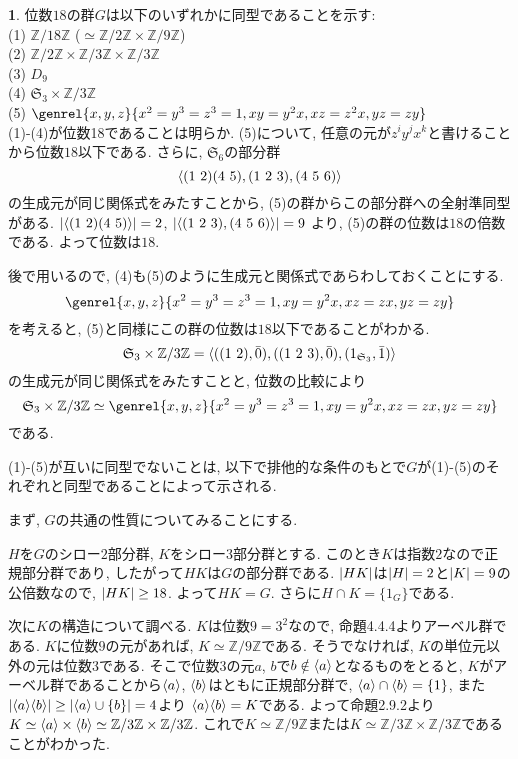 \documentclass{article}
\theoremstyle{definition}
\newtheorem{ans}{}
\numberwithin{ans}{subsection}
\newcommand{\Z}[1]{\mathbb{Z}/#1\mathbb{Z}}
\DeclarePairedDelimiter{\gen}{\langle}{\rangle}
\DeclarePairedDelimiter{\order}{\lvert}{\rvert}
\begin{document}
\begin{ans}
  位数$18$の群$G$は以下のいずれかに同型であることを示す:\\
  (1) $\Z{18}$ ($\simeq \Z{2} \times \Z{9}$)\\
  (2) $\Z{2} \times \Z{3} \times \Z{3}$\\
  (3) $D_9$\\
  (4) $\mathfrak{S}_3 \times \Z{3}$\\
  (5) $\genrel{x, y, z}{x^2 = y^3 = z^3 = 1, xy = y^2x, xz = z^2x, yz = zy}$\\

  (1)-(4)が位数18であることは明らか.
  (5)について, 任意の元が$z^iy^jx^k$と書けることから位数$18$以下である.
  さらに, $\mathfrak{S}_6$の部分群
  \[
    \gen{(1\ 2)(4\ 5), (1\ 2\ 3), (4\ 5\ 6)}
  \]
  の生成元が同じ関係式をみたすことから, (5)の群からこの部分群への全射準同型がある.
  $\order{\gen{(1\ 2)(4\ 5)}} = 2$, $\order{\gen{(1\ 2\ 3), (4\ 5\ 6)}} = 9$
  より, (5)の群の位数は$18$の倍数である. よって位数は$18$.

  後で用いるので, (4)も(5)のように生成元と関係式であらわしておくことにする.
  \[
    \genrel{x, y, z}{x^2 = y^3 = z^3 = 1, xy = y^2x, xz = zx, yz = zy}
  \]
  を考えると, (5)と同様にこの群の位数は$18$以下であることがわかる.
  \[
    \mathfrak{S}_3 \times \Z{3} = \gen{((1\ 2), \bar{0}), ((1\ 2\ 3), \bar{0}), (1_{\mathfrak{S}_3}, \bar{1})}
  \]
  の生成元が同じ関係式をみたすことと, 位数の比較により
  \[
    \mathfrak{S}_3 \times \Z{3} \simeq \genrel{x, y, z}{x^2 = y^3 = z^3 = 1, xy = y^2x, xz = zx, yz = zy}
  \]
  である.

  (1)-(5)が互いに同型でないことは, 以下で排他的な条件のもとで$G$が(1)-(5)のそれぞれと同型であることによって示される.

  まず, $G$の共通の性質についてみることにする.

  $H$を$G$のシロー$2$部分群, $K$をシロー$3$部分群とする.
  このとき$K$は指数$2$なので正規部分群であり, したがって$HK$は$G$の部分群である.
  $\order{HK}$は$\order{H} = 2$と$\order{K} = 9$の公倍数なので, $\order{HK} \ge 18$.
  よって$HK = G$. さらに$H \cap K = \{1_G\}$である.

  次に$K$の構造について調べる.
  $K$は位数$9 = 3^2$なので, 命題4.4.4よりアーベル群である.
  $K$に位数$9$の元があれば, $K \simeq \Z{9}$である.
  そうでなければ, $K$の単位元以外の元は位数$3$である.
  そこで位数$3$の元$a$, $b$で$b \notin \gen{a}$となるものをとると,
  $K$がアーベル群であることから$\gen{a}$, $\gen{b}$はともに正規部分群で,
  $\gen{a} \cap \gen{b} = \{ 1 \}$,
  また$\order{\gen{a}\gen{b}} \ge \order{\gen{a} \cup \{b\}} = 4$より
  $\gen{a}\gen{b} = K$である.
  よって命題2.9.2より$K \simeq \gen{a} \times \gen{b} \simeq \Z{3} \times \Z{3}$.
  これで$K \simeq \Z{9}$または$K \simeq \Z{3} \times \Z{3}$であることがわかった.


\end{ans}
\end{document}
